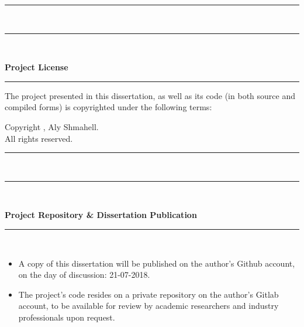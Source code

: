 \documentclass[a4paper, 12pt]{report}
\newenvironment{nscenter}
{\parskip=0.2cm\par\nopagebreak\raggedright}
{\parskip=0pt\par\noindent\ignorespacesafterend}
\begin{document}
\begin{titlepage}
\begin{nscenter}
	\end{nscenter}	
	\rule{\linewidth}{0.2mm} \\[0.5cm]
	\noindent
	\rule{\linewidth}{0.5mm} \\[0.2cm]
	\begin{minipage}{0.5\textwidth}
		\Large{\textbf{Project License}}
	\end{minipage}
	\begin{minipage}{0.5\textwidth}
		\begin{flushright}
			\Huge{\textcopyright}
		\end{flushright}
	\end{minipage}
	\rule{\linewidth}{0.2mm}
	\noindent
	\vspace{-0.45cm}
	\begin{nscenter}
		The project presented in this dissertation, as well as its code (in both source and compiled forms) is copyrighted under the following terms:
	\end{nscenter}
	\vspace{-0.5cm}
	\begin{tcbraster}[raster columns=2,raster rows=1,
		enhanced,size=small,fit algorithm=hybrid* ]
		\begin{nscenter}
			\begin{tcolorbox}[colback=white]
				\begin{center}
					Copyright \textcopyright {}, Aly Shmahell.\\
					All rights reserved.
				\end{center}
			\end{tcolorbox}
		\end{nscenter}
	\end{tcbraster}
	\rule{\linewidth}{0.2mm} \\[0.5cm]
	\noindent
	\rule{\linewidth}{0.5mm} \\[0.2cm]
	\begin{minipage}{\textwidth}
		\Large{\textbf{Project Repository \& Dissertation Publication}}
	\end{minipage}
	\rule{\linewidth}{0.2mm} \\[0.1cm]
	\noindent
	\vspace{-0.6cm}
		\begin{itemize}[nosep]
		\item A copy of this dissertation will be published on the author's Github account, on the day of discussion: 21-07-2018.
		\item The project's code resides on a private repository on the author's Gitlab account, to be available for review by academic researchers and industry professionals upon request.

\end{itemize}
\end{titlepage}
\end{document}
